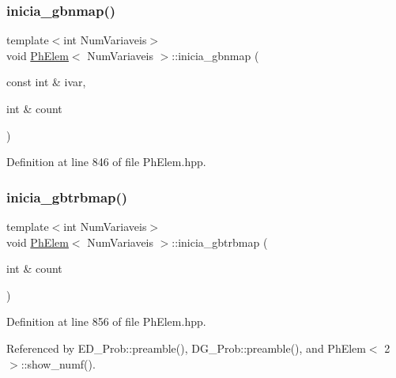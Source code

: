 \subsubsection{\texorpdfstring{inicia\+\_\+gbnmap()}{inicia\_gbnmap()}\hspace{0.1cm}{\footnotesize\ttfamily [2/2]}}
{\footnotesize\ttfamily template$<$int Num\+Variaveis$>$ \\
void \hyperlink{classPhElem}{Ph\+Elem}$<$ Num\+Variaveis $>$\+::inicia\+\_\+gbnmap (\begin{DoxyParamCaption}\item[{const int \&}]{ivar,  }\item[{int \&}]{count }\end{DoxyParamCaption})}



Definition at line 846 of file Ph\+Elem.\+hpp.

\mbox{\label{classPhElem_a9b5610a7a12eddbc4a9f07429500a6da}} 
\subsubsection{\texorpdfstring{inicia\+\_\+gbtrbmap()}{inicia\_gbtrbmap()}}
{\footnotesize\ttfamily template$<$int Num\+Variaveis$>$ \\
void \hyperlink{classPhElem}{Ph\+Elem}$<$ Num\+Variaveis $>$\+::inicia\+\_\+gbtrbmap (\begin{DoxyParamCaption}\item[{int \&}]{count }\end{DoxyParamCaption})}



Definition at line 856 of file Ph\+Elem.\+hpp.



Referenced by E\+D\+\_\+\+Prob\+::preamble(), D\+G\+\_\+\+Prob\+::preamble(), and Ph\+Elem$<$ 2 $>$\+::show\+\_\+numf().

